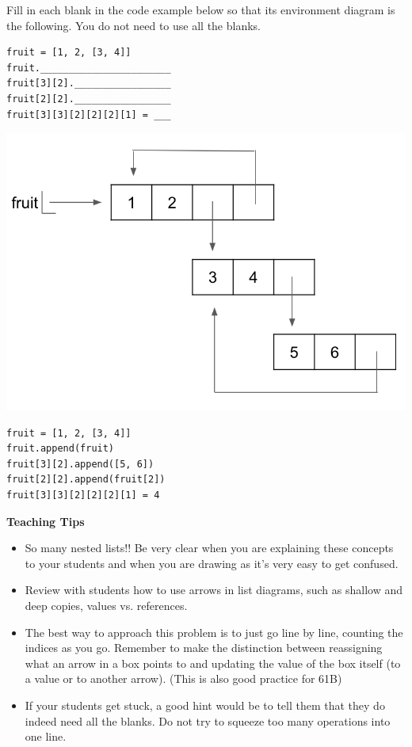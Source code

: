 \begin{blocksection}
\question Fill in each blank in the code example below so that its environment diagram is the following. You do not need to use all the blanks.

\begin{multicols}{2}
\begin{lstlisting}
fruit = [1, 2, [3, 4]]
fruit._______________________
fruit[3][2]._________________
fruit[2][2]._________________
fruit[3][3][2][2][2][1] = ___
\end{lstlisting}

\columnbreak
\includegraphics[width=.45\textwidth]{fruit_loops.png}
\end{multicols}

\begin{solution}
\begin{lstlisting}
fruit = [1, 2, [3, 4]]
fruit.append(fruit)
fruit[3][2].append([5, 6])
fruit[2][2].append(fruit[2])
fruit[3][3][2][2][2][1] = 4
\end{lstlisting}
\end{solution}
\end{blocksection}

\begin{blocksection}
\begin{guide}
\textbf{Teaching Tips}
\begin{itemize}
	\item So many nested lists!! Be very clear when you are explaining these concepts to your students and when you are drawing as it's very easy to get confused.
	\item Review with students how to use arrows in list diagrams, such as shallow and deep copies, values vs. references.
	\item The best way to approach this problem is to just go line by line, counting the indices as you go. Remember to make the distinction between reassigning what an arrow in a box points to and updating the value of the box itself (to a value or to another arrow). (This is also good practice for 61B)
	\item If your students get stuck, a good hint would be to tell them that they do indeed need all the blanks. Do not try to squeeze too many operations into one line.
\end{itemize}
\end{guide}
\end{blocksection}
